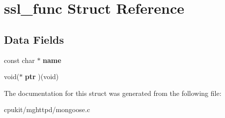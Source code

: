 \hypertarget{structssl__func}{}\section{ssl\+\_\+func Struct Reference}
\label{structssl__func}
\subsection*{Data Fields}
\begin{DoxyCompactItemize}
\item 
\mbox{\label{structssl__func_a08db4b182e28d1c7ce21f23fb90562d4}} 
const char $\ast$ {\bfseries name}
\item 
\mbox{\label{structssl__func_a067babe28207943de29276297bd82513}} 
void($\ast$ {\bfseries ptr} )(void)
\end{DoxyCompactItemize}


The documentation for this struct was generated from the following file\+:\begin{DoxyCompactItemize}
\item 
cpukit/mghttpd/mongoose.\+c\end{DoxyCompactItemize}
